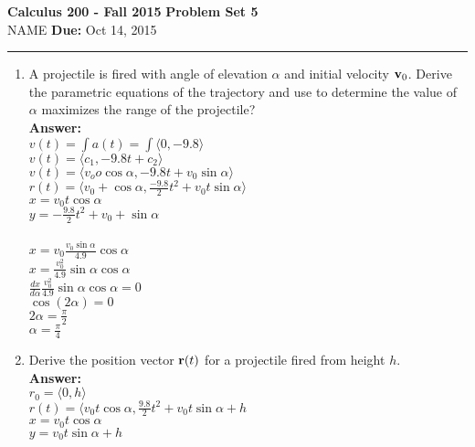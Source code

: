 \documentclass[11pt]{article}
\newcommand{\hwheadings}[3]{
{\bf Calculus 200 -  Fall 2015} \hfill {{\bf Problem Set #1}}\\
{{\bf } #2} \hfill {{\bf Due:} #3} \\
\rule[0.1in]{\textwidth}{0.025in}
}
\begin{document}
\hwheadings{5}{NAME }{Oct 14, 2015}


\begin{enumerate}


    
    
    
    \item A projectile is fired with angle of elevation $\alpha$ and initial velocity ${\bf v}_0$.  Derive the parametric equations of the trajectory and use to determine the value of $\alpha$ maximizes the range of the projectile?  
    \\
    \textbf{Answer:}
    \\
    $v(t)= \int a(t)= \int \langle 0, -9.8 \rangle $
    \\
    $v(t)=\langle c_1, -9.8t+c_2 \rangle$
    \\
    $v(t)=\langle v_oo \cos \alpha, -9.8 t + v_0 \sin \alpha \rangle$
    \\
    $r(t)=\langle v_0 + \cos \alpha, \frac{-9.8}{2}t^2+v_0t \sin \alpha \rangle$
    \\
    $x=v_0 t \cos \alpha$
    \\
    $y=-\frac{9.8}{2}t^2+v_0+\sin \alpha$
    \\
    \\
    $x=v_0 \frac{v_0 \sin \alpha}{4.9}\cos \alpha$
    \\
    $x=\frac{v_0^2}{4.9} \sin \alpha \cos \alpha$
    \\
    $\frac{dx}{d \alpha} \frac{v_0^2}{4.9} \sin \alpha \cos \alpha =0$
    \\
    $\cos (2 \alpha)=0 $
    \\
    $2 \alpha= \frac{\pi}{2}$
    \\
    $\alpha=\frac{\pi}{4}$
    
    
    \item Derive the position vector ${\bf r}(t)$ for a projectile fired from height $h$.  
    \\
    \textbf{Answer:}
    \\
    $r_0=\langle 0,h \rangle$
    \\
    $r(t)=\langle v_0 t \cos \alpha, \frac{9.8}{2}t^2+v_0 t \sin \alpha + h$
    \\
    $x=v_0 t \cos \alpha$
    \\
    $y=v_0t \sin \alpha +h$
    

\end{enumerate}
\end{document}
